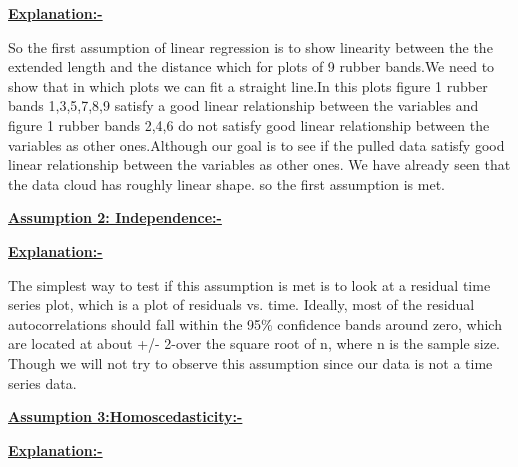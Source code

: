 \hspace{-5 mm}\underline{\textbf{Explanation:-}}
\newline

\hspace{-5 mm}So the first assumption of linear regression is to show linearity between the the extended length and the distance which for plots of 9 rubber bands.We need to show that in which plots we can fit a straight line.In this plots figure 1 rubber bands 1,3,5,7,8,9 satisfy a good linear relationship between the variables and figure 1 rubber bands 2,4,6 do not satisfy good linear relationship between the variables as other ones.Although our goal is to see if the pulled data satisfy good linear relationship between the variables as other ones. We have already seen that the data cloud has roughly linear shape. so the first assumption is met.\newline


\hspace{ -5 mm}\underline{\textbf{Assumption 2: Independence:-}}
\newline

\hspace{-5 mm}\underline{\textbf{Explanation:-}}
\newline
 
\hspace{ -5 mm}The simplest way to test if this assumption is met is to look at a residual time series plot, which is a plot of residuals vs. time. Ideally, most of the residual autocorrelations should fall within the 95\% confidence bands around zero, which are located at about +/- 2-over the square root of n, where n is the sample size. Though we will not try to observe this assumption since our data is not a time series data.\newline

\hspace{ -5 mm}\underline{\textbf{Assumption 3:Homoscedasticity:- }}
\newline

\hspace{-5 mm}\underline{\textbf{Explanation:-}}
\newline

